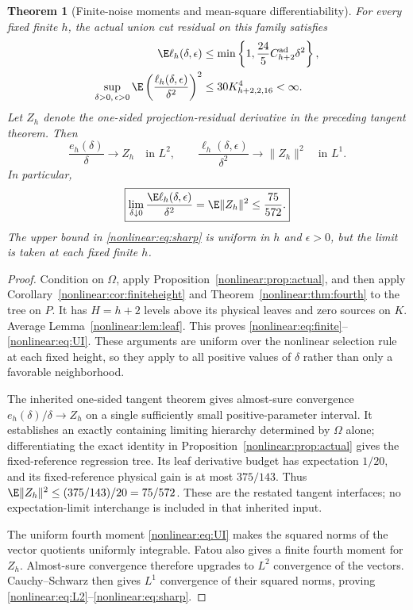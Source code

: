 \documentclass[11pt,oneside,openany,a4paper]{book}
\numberwithin{equation}{chapter}
\newtheorem{theorem}{Theorem}[chapter]
\theoremstyle{definition}
\theoremstyle{remark}
\begin{document}
\begin{theorem}[Finite-noise moments and mean-square differentiability]\label{nonlinear:thm:main}
For every fixed finite $h$, the actual union cut residual on this family satisfies
\begin{align}
 \E\ell_h(\delta,\epsilon)
 &\le\min\left\{1,\frac{24}{5}C_{h+2}^{\rm ad}\delta^2\right\},\label{nonlinear:eq:finite}\\
 \sup_{\delta>0,\,\epsilon>0}\E\left(\frac{\ell_h(\delta,\epsilon)}{\delta^2}\right)^2
 &\le30K_{h+2,2,16}^4<\infty.\label{nonlinear:eq:UI}
\end{align}
Let $Z_h$ denote the one-sided projection-residual derivative in the preceding tangent theorem. Then
\begin{equation}\label{nonlinear:eq:L2}
 \frac{e_h(\delta)}\delta\longrightarrow Z_h\quad\text{in }L^2,
 \qquad
 \frac{\ell_h(\delta,\epsilon)}{\delta^2}\longrightarrow\|Z_h\|^2\quad\text{in }L^1.
\end{equation}
In particular,
\begin{equation}\label{nonlinear:eq:sharp}
 \boxed{\lim_{\delta\downarrow0}\frac{\E\ell_h(\delta,\epsilon)}{\delta^2}
   =\E\|Z_h\|^2\le\frac{75}{572}.}
\end{equation}
The upper bound in \eqref{nonlinear:eq:sharp} is uniform in $h$ and $\epsilon>0$, but the limit is taken at each fixed finite $h$.
\end{theorem}
\begin{proof}
Condition on $\Omega$, apply Proposition~\ref{nonlinear:prop:actual}, and then apply Corollary~\ref{nonlinear:cor:finiteheight} and Theorem~\ref{nonlinear:thm:fourth} to the tree on $P$. It has $H=h+2$ levels above its physical leaves and zero sources on $K$. Average Lemma~\ref{nonlinear:lem:leaf}. This proves \eqref{nonlinear:eq:finite}--\eqref{nonlinear:eq:UI}. These arguments are uniform over the nonlinear selection rule at each fixed height, so they apply to all positive values of $\delta$ rather than only a favorable neighborhood.

The inherited one-sided tangent theorem gives almost-sure convergence $e_h(\delta)/\delta\to Z_h$ on a single sufficiently small positive-parameter interval. It establishes an exactly containing limiting hierarchy determined by $\Omega$ alone; differentiating the exact identity in Proposition~\ref{nonlinear:prop:actual} gives the fixed-reference regression tree. Its leaf derivative budget has expectation $1/20$, and its fixed-reference physical gain is at most $375/143$. Thus $\E\|Z_h\|^2\le(375/143)/20=75/572$. These are the restated tangent interfaces; no expectation-limit interchange is included in that inherited input.

The uniform fourth moment \eqref{nonlinear:eq:UI} makes the squared norms of the vector quotients uniformly integrable. Fatou also gives a finite fourth moment for $Z_h$. Almost-sure convergence therefore upgrades to $L^2$ convergence of the vectors. Cauchy--Schwarz then gives $L^1$ convergence of their squared norms, proving \eqref{nonlinear:eq:L2}--\eqref{nonlinear:eq:sharp}.
\end{proof}
\end{document}
